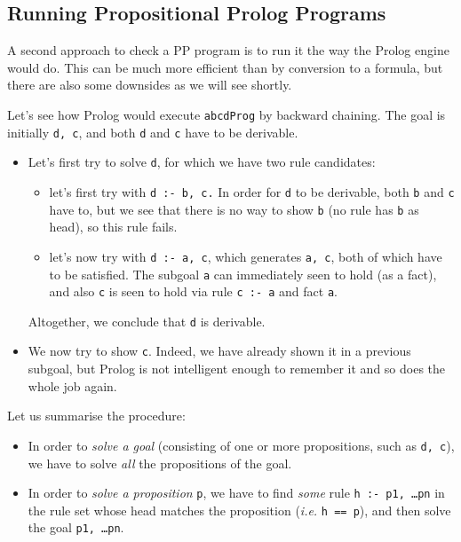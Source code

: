\documentclass[english]{article}
\begin{document}
\subsection{Running Propositional Prolog Programs}\label{sec:running_prolog}

A second approach to check a PP program is to run it the way the Prolog engine
would do. This can be much more efficient than by conversion to a formula, but
there are also some downsides as we will see shortly.

Let's see how Prolog would execute \texttt{abcdProg} by backward chaining. The
goal is initially \texttt{d, c}, and both \texttt{d} and \texttt{c} have to be
derivable.
\begin{itemize}
\item Let's first try to solve \texttt{d}, for which we have two rule
  candidates:
  \begin{itemize}
  \item let's first try with \texttt{d :- b, c.} In order for \texttt{d} to be
    derivable, both \texttt{b} and \texttt{c} have to, but we see that there
    is no way to show \texttt{b} (no rule has \texttt{b} as head), so this
    rule fails.
  \item let's now try with \texttt{d :- a, c}, which generates 
    \texttt{a, c}, both of which have to be satisfied. The subgoal \texttt{a}
    can immediately seen to hold (as a fact), and also \texttt{c} is seen to
    hold via rule \texttt{c :- a} and fact \texttt{a}. 
  \end{itemize}
  Altogether, we conclude that \texttt{d} is derivable.
\item We now try to show \texttt{c}. Indeed, we have already shown it in a
  previous subgoal, but Prolog is not intelligent enough to remember it and so
  does the whole job again.
\end{itemize}

Let us summarise the procedure:
\begin{itemize}
\item In order to \emph{solve a goal} (consisting of one or more propositions, such
  as \texttt{d, c}), we have to solve \emph{all} the propositions of the goal.
\item In order to \emph{solve a proposition} \texttt{p}, we have to find \emph{some} rule
  \texttt{h :- p1, \dots pn} in the rule set whose head matches the
  proposition (\emph{i.e.} \texttt{h == p}), and then solve the goal \texttt{p1, \dots pn}.
\end{itemize}
\end{document}

